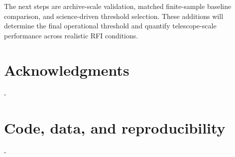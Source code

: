 \documentclass[10pt,letterpaper]{article}
\begin{document}
The next steps are archive-scale validation, matched finite-sample baseline comparison, and science-driven threshold selection. These additions will determine the final operational threshold and quantify telescope-scale performance across realistic RFI conditions.

\section*{Acknowledgments}
-

\section*{Code, data, and reproducibility}
-

\printbibliography
\end{document}
